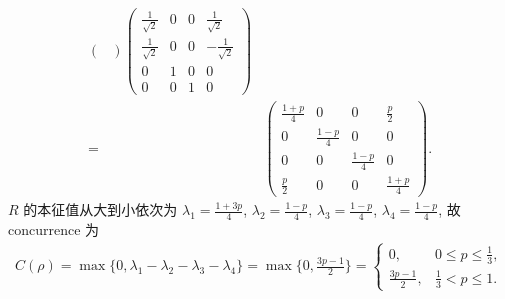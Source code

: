 \documentclass{assignment}
\begin{document}
\begin{sol}
{\begin{align}
\begin{pmatrix}
        \end{pmatrix}\begin{pmatrix}
            \frac{1}{\sqrt{2}}&0&0&\frac{1}{\sqrt{2}}\\
            \frac{1}{\sqrt{2}}&0&0&-\frac{1}{\sqrt{2}}\\
            0&1&0&0\\
            0&0&1&0
        \end{pmatrix}\\
        =&\begin{pmatrix}
            \frac{1+p}{4}&0&0&\frac{p}{2}\\
            0&\frac{1-p}{4}&0&0\\
            0&0&\frac{1-p}{4}&0\\
            \frac{p}{2}&0&0&\frac{1+p}{4}
        \end{pmatrix}.
    \end{align}
    }
    $R$ 的本征值从大到小依次为 $\lambda_1=\frac{1+3p}{4}$, $\lambda_2=\frac{1-p}{4}$, $\lambda_3=\frac{1-p}{4}$, $\lambda_4=\frac{1-p}{4}$, 故 concurrence 为
    \begin{align}
        C(\rho)=\max\{0,\lambda_1-\lambda_2-\lambda_3-\lambda_4\}=\max\{0,\frac{3p-1}{2}\}=\left\{\begin{array}{ll}
            0,&0\leq p\leq\frac{1}{3},\\
            \frac{3p-1}{2},&\frac{1}{3}<p\leq 1.
        \end{array}\right.
    \end{align}
\end{sol}
\end{document}
